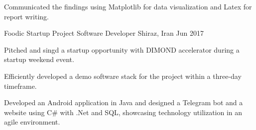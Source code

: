 \begin{cventries}
{\begin{cvitems}
      \item{Communicated the findings using Matplotlib for data visualization and Latex for report writing.}
    \end{cvitems}
  }%
  \cventry
  {Foodic Startup Project} %
  {Software Developer} %
    {Shiraz, Iran} %
    {Jun 2017} %
    {
      \begin{cvitems} %
        \item{Pitched and singd a startup opportunity with DIMOND accelerator during a startup weekend event.}
        \item{Efficiently developed a demo software stack for the project within a three-day timeframe.}
        \item{Developed an Android application in Java and designed a Telegram bot and a website using C\# with .Net and SQL, showcasing technology utilization in an agile environment.}
      \end{cvitems}
    }%
\end{cventries}
